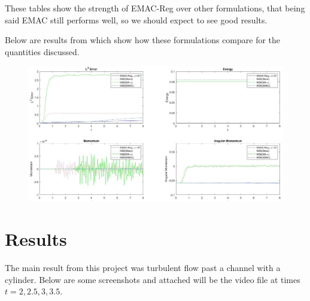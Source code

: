 \documentclass[12pt]{article}
\numberwithin{equation}{section}
\begin{document}
These tables show the strength of EMAC-Reg over other formulations, that being said EMAC still performs well, so we should expect to see good results.

Below are results from \cite{I20} which show how these formulations compare for the quantities discussed.

\begin{figure}[H]
\centering
\includegraphics[scale=.4]{Quant_comparison.jpg}
\end{figure}

\section{Results}

The main result from this project was turbulent flow past a channel with a cylinder.  Below are some screenshots and attached will be the video file at times $t=2,2.5,3,3.5$.
\end{document}

